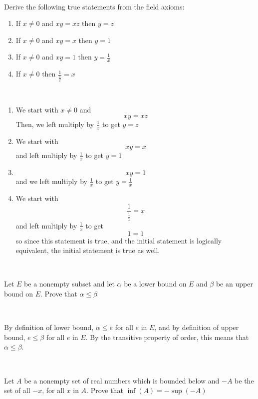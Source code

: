 \documentclass{article}
\begin{document}
\begin{exercise}
\

Derive the following true statements from the field axioms:

\begin{enumerate}
    \item If $x\neq 0$ and $xy= xz$ then $y=z$
    \item If $x\neq 0$ and $xy = x$ then $y=1$
    \item If $x \neq 0$ and $xy=1$ then $y = \frac{1}{x}$
    \item If $x\neq 0$ then $\frac{1}{\frac{1}{x}} = x$
\end{enumerate}
\end{exercise}

\begin{solution}
\

\begin{enumerate}
    \item We start with $x\neq 0$ and $$xy = xz$$Then, we left multiply by $\frac{1}{x}$ to get $y = z$
    \item We start with $$xy=x$$and left multiply by $\frac{1}{x}$ to get $y = 1$
    \item $$xy=1$$and we left multiply by $\frac{1}{x}$ to get $y = \frac{1}{x}$
    \item We start with$$\frac{1}{\frac{1}{x}} = x$$and left multiply by $\frac{1}{x}$ to get $$1 = 1$$so since this statement is true, and the initial statement is logically equivalent, the initial statement is true as well.
\end{enumerate}
\end{solution}

\begin{exercise}[4]
\

Let $E$ be a nonempty subset and let $\alpha$ be a lower bound on $E$ and $\beta$ be an upper bound on $E$. Prove that $\alpha \leq \beta$
\end{exercise}

\begin{solution}
\

By definition of lower bound, $\alpha \leq e$ for all $e$ in $E$, and by definition of upper bound, $e \leq \beta$ for all $e$ in $E$. By the transitive property of order, this means that $\alpha \leq \beta$.
\end{solution}

\begin{exercise}[5]
\

Let $A$ be a nonempty set of real numbers which is bounded below and $-A$ be the set of all $-x$, for all $x$ in $A$. Prove that $\inf(A) = -\sup(-A)$
\end{exercise}
\end{document}
